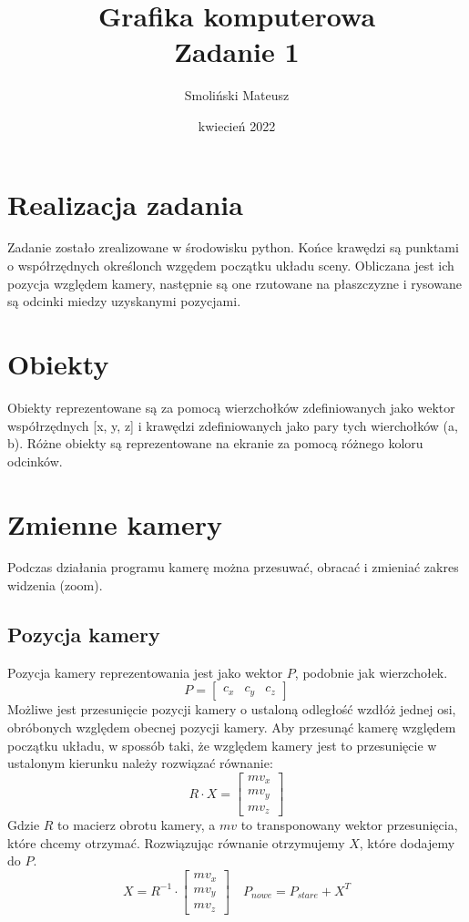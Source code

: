 \documentclass[a4paper,11pt]{article}
\title{Grafika komputerowa \\
{Zadanie 1}}
\author{Smoliński Mateusz}
\date{kwiecień 2022}
\begin{document}
\maketitle

\section{Realizacja zadania}
Zadanie zostało zrealizowane w środowisku python. Końce krawędzi 
są punktami o współrzędnych określonch wzgędem początku układu 
sceny. Obliczana jest ich pozycja względem kamery, następnie są 
one rzutowane na płaszczyzne i rysowane są odcinki miedzy 
uzyskanymi pozycjami. 

\section{Obiekty}
Obiekty reprezentowane są za pomocą wierzchołków zdefiniowanych jako 
wektor współrzędnych [x, y, z] i krawędzi zdefiniowanych jako pary
tych wierchołków (a, b). Różne obiekty są reprezentowane na ekranie 
za pomocą różnego koloru odcinków.

\section{Zmienne kamery}
Podczas działania programu kamerę można przesuwać, obracać i zmieniać 
zakres widzenia (zoom).

\subsection{Pozycja kamery}
Pozycja kamery reprezentowania jest jako wektor \(P\), podobnie jak 
wierzchołek.
\[
    P=
    \begin{bmatrix}
        c_x & c_y & c_z
    \end{bmatrix}    
\]
Możliwe jest przesunięcie pozycji kamery o 
ustaloną odległość wzdłóż jednej osi, obróbonych względem 
obecnej pozycji kamery. Aby przesunąć kamerę względem początku 
układu, w spossób taki, że względem kamery jest to przesunięcie 
w ustalonym kierunku należy rozwiązać równanie:
\[
    R \cdot X = 
    \begin{bmatrix}
        mv_x \\ mv_y \\ mv_z
    \end{bmatrix} 
\]
Gdzie \(R\) to macierz obrotu kamery, a \(mv\) to transponowany 
wektor przesunięcia, które chcemy otrzymać. Rozwiązując równanie
otrzymujemy \(X\), które dodajemy do \(P\).
\[
    X = R^{-1} \cdot
    \begin{bmatrix}
        mv_x \\ mv_y \\ mv_z
    \end{bmatrix}
    \quad
    P_{nowe} = P_{stare} + X^T
\]
\end{document}
